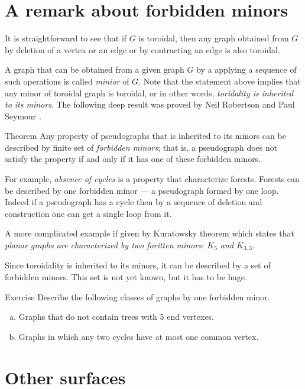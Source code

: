 \section*{A remark about forbidden minors}

It is straightforward to see that if $G$ is toroidal, then any graph obtained from $G$ by deletion of a vertex or an edge or by contracting an edge is also toroidal.

A graph that can be obtained from a given graph $G$ by a applying a sequence of such operations is called \emph{minior} of $G$.
Note that the statement above implies that any minor of toroidal graph is toroidal, or in other words, {}\emph{toridality is inherited to its minors}.
The following deep result was proved by Neil Robertson and Paul Seymour \cite{robertson-seymour}.

\begin{thm}{Theorem}
Any property of pseudographs that is inherited to its minors can be 
described by finite set of \emph{forbidden minors};
that is,  a pseudograph does not satisfy the property if and only if it has one of these forbidden minors.
\end{thm}

For example, \emph{absence of cycles} is a property that characterize forests.
Forests can be described by one forbidden minor --- a pseudograph formed by one loop.
Indeed if a pseudograph has a cycle then by a sequence of deletion and construction one can get a single loop from it.

A more complicated example if given by Kuratowsky theorem which states that \emph{planar graphs are characterized by two foritten minors: $K_5$ and $K_{3,3}$.}

Since toroidality is inherited to its minors, it can be described by a set of forbidden minors.
This set is not yet known, but it has to be huge.

\begin{thm}{Exercise}
Describe the following classes of graphs by one forbidden minor.
\begin{enumerate}[(a)]
 \item Graphs that do not contain trees with 5 end vertexes.
 \item Graphs in which any two cycles have at most one common vertex.
\end{enumerate}

\end{thm}

\section*{Other surfaces}

